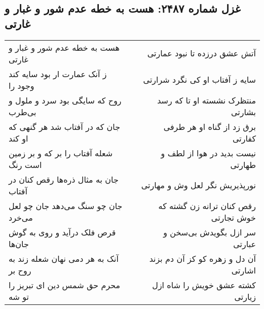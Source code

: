 \begin{center}
\section*{غزل شماره ۲۴۸۷: هست به خطه عدم شور و غبار و غارتی}
\label{sec:2487}
\begin{longtable}{l p{0.5cm} r}
هست به خطه عدم شور و غبار و غارتی
&&
آتش عشق درزده تا نبود عمارتی
\\
ز آنک عمارت ار بود سایه کند وجود را
&&
سایه ز آفتاب او کی نگرد شرارتی
\\
روح که سایگی بود سرد و ملول و بی‌طرب
&&
منتظرک نشسته او تا که رسد بشارتی
\\
جان که در آفتاب شد هر گنهی که او کند
&&
برق زد از گناه او هر طرفی کفارتی
\\
شعله آفتاب را بر که و بر زمین است رنگ
&&
نیست بدید در هوا از لطف و طهارتی
\\
جان به مثال ذره‌ها رقص کنان در آفتاب
&&
نورپذیریش نگر لعل وش و مهارتی
\\
جان چو سنگ می‌دهد جان چو لعل می‌خرد
&&
رقص کنان ترانه زن گشته که خوش تجارتی
\\
قرص فلک درآید و روی به گوش جان‌ها
&&
سر ازل بگویدش بی‌سخن و عبارتی
\\
آنک به هر دمی نهان شعله زند به روح بر
&&
آن دل و زهره کو کز آن دم بزند اشارتی
\\
محرم حق شمس دین ای تبریز را تو شه
&&
کشته عشق خویش را شاه ازل زیارتی
\\
\end{longtable}
\end{center}

